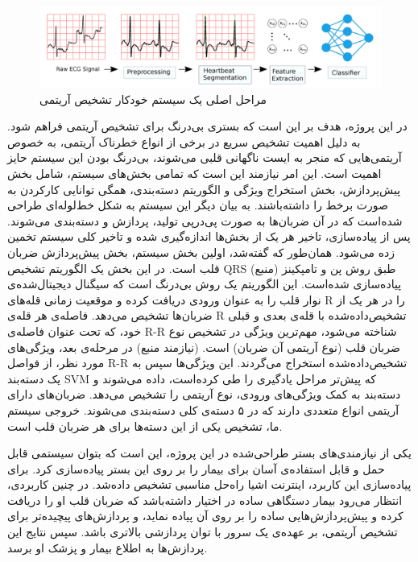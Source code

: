\begin{figure}[!htb]
\centering
\includegraphics[width=15cm]{Figures/classifier.png}
\caption{مراحل اصلی یک سیستم خودکار تشخیص آریتمی\cite{Mondejar}}
\label{fig:classifierPicture}
\end{figure}

در این پروژه، هدف بر این است که بستری بی‌درنگ برای تشخیص آریتمی فراهم شود. به دلیل اهمیت تشخیص سریع در برخی از انواع خطرناک آریتمی، به خصوص آریتمی‌هایی که منجر به ایست ناگهانی قلبی می‌شوند، بی‌درنگ بودن این سیستم حایز اهمیت است. این امر نیازمند این است که تمامی بخش‌های سیستم، شامل بخش پیش‌پردازش،‌ بخش استخراج ویژگی و الگوریتم دسته‌بندی، همگی توانایی کارکردن به صورت برخط را داشته‌باشند. به بیان دیگر این سیستم به شکل خط‌لوله‌ای طراحی شده‌است که در آن ضربان‌ها به صورت پی‌در‌پی تولید، پردازش‌ و دسته‌بندی می‌شوند. پس از پیاده‌سازی، تاخیر هر یک از بخش‌ها اندازه‌گیری شده و تاخیر کلی سیستم تخمین زده می‌شود. 
همان‌طور که گفته‌شد، اولین بخش سیستم، بخش پیش‌پردازش ضربان قلب است. در این بخش یک الگوریتم تشخیص QRS طبق روش پن و تامپکینز (منبع)  پیاده‌سازی شده‌است. این الگوریتم یک روش بی‌درنگ است که سیگنال دیجیتال‌شده‌ی نوار قلب را به عنوان ورودی دریافت کرده و موقعیت زمانی قله‌های R را در هر یک از ضربان‌ها تشخیص می‌دهد. فاصله‌ی هر قله‌ی R تشخیص‌داده‌شده با قله‌ی بعدی و قبلی خود، که تحت عنوان فاصله‌ی R-R شناخته می‌شود، مهم‌ترین ویژگی در تشخیص نوع ضربان قلب (نوع آریتمی آن ضربان) است. (نیازمند منبع) 
در مرحله‌ی بعد، ویژگی‌های مورد نظر، از فواصل R-R تشخیص‌داده‌شده استخراج می‌گردند. این ویژگی‌ها سپس به یک دسته‌بند SVM که پیش‌تر مراحل یادگیری را طی کرده‌است، داده می‌شوند و دسته‌بند به کمک ویژگی‌های ورودی، نوع آریتمی را تشخیص می‌دهد. ضربان‌های دارای آریتمی انواع متعددی دارند که در ۵ دسته‌ی کلی دسته‌بندی می‌شوند. خروجی سیستم ما، تشخیص یکی از این دسته‌ها برای هر ضربان قلب است.

یکی از نیازمندی‌های بستر طراحی‌شده در این پروژه، این است که بتوان سیستمی قابل حمل و قابل استفاده‌ی آسان برای بیمار را بر روی این بستر پیاده‌سازی کرد. برای پیاده‌سازی این کاربرد، اینترنت اشیا راه‌حل مناسبی تشخیص داده‌شد. در چنین کاربردی، انتظار می‌رود بیمار دستگاهی ساده در اختیار داشته‌باشد که ضربان قلب او را دریافت کرده و پیش‌پردازش‌هایی ساده را بر روی آن پیاده نماید، و پردازش‌های پیچیده‌تر برای تشخیص آریتمی، بر عهده‌ی یک سرور با توان پردازشی بالاتری باشد. سپس نتایج این پردازش‌ها به اطلاع بیمار و پزشک او برسد.

